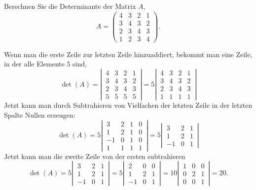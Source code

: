 Berechnen Sie die Determinante der Matrix $A$,
\[
A=\begin{pmatrix}
4&3&2&1\\
3&4&3&2\\
2&3&4&3\\
1&2&3&4
\end{pmatrix}.
\]


\begin{loesung}
Wenn man die erste Zeile zur letzten Zeile hinzuaddiert, bekommt man eine
Zeile, in der alle Elemente $5$ sind, 
\[
\det(A)
=
\left|\,
\begin{matrix}
 4& 3& 2& 1\\
 3& 4& 3& 2\\
 2& 3& 4& 3\\
 5& 5& 5& 5
\end{matrix}
\,\right|
=5
\left|\,
\begin{matrix}
4&3&2&1\\
3&4&3&2\\
2&3&4&3\\
1&1&1&1
\end{matrix}
\,\right|
\]
Jetzt kann man durch Subtrahieren von Vielfachen der letzten Zeile in
der letzten Spalte Nullen erzeugen:
\[
\det(A)
=
5
\left|\,
\begin{matrix}
 3&2&1&0\\
 1&2&1&0\\
-1&0&1&0\\
 1&1&1&1
\end{matrix}
\,\right|
=
5
\left|\,
\begin{matrix}
 3&2&1\\
 1&2&1\\
-1&0&1
\end{matrix}
\,\right|
\]
Jetzt kann man die zweite Zeile von der ersten subtrahieren
\[
\det(A)
=
5
\left|\,
\begin{matrix}
 3&2&1\\
 1&2&1\\
-1&0&1
\end{matrix}
\,\right|
=
5
\left|\,
\begin{matrix}
 2&0&0\\
 1&2&1\\
-1&0&1
\end{matrix}
\,\right|
=
10
\left|\,
\begin{matrix}
1&0&0\\
0&2&1\\
0&0&1
\end{matrix}
\,\right|
=20.
\]


\end{loesung}
